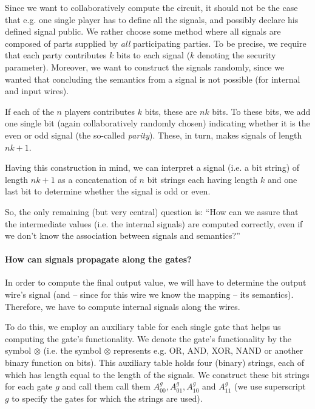 Since we want to collaboratively compute the circuit, it should not be the case that e.g. one single player has to define all the signals, and possibly declare his defined signal public. We rather choose some method where all signals are composed of parts supplied by \emph{all} participating parties. To be precise, we require that each party contributes $k$ bits to each signal ($k$ denoting the security parameter). Moreover, we want to construct the signals randomly, since we wanted that concluding the semantics from a signal is not possible (for internal and input wires).

If each of the $n$ players contributes $k$ bits, these are $nk$ bits. To these bits, we add one single bit (again collaboratively randomly chosen) indicating whether it is the even or odd signal (the so-called \emph{parity}). These, in turn, makes signals of length $nk+1$.

Having this construction in mind, we can interpret a signal (i.e. a bit string) of length $nk+1$ as a concatenation of $n$ bit strings each having length $k$ and one last bit to determine whether the signal is odd or even.

So, the only remaining (but very central) question is: ``How can we assure that the intermediate values (i.e. the internal signals) are computed correctly, even if we don't know the association between signals and semantics?''

\paragraph{How can signals propagate along the gates?}
\label{sec:how-can-signals-propagate}

In order to compute the final output value, we will have to determine the output wire's signal (and -- since for this wire we know the mapping -- its semantics). Therefore, we have to compute internal signals along the wires.

To do this, we employ an auxiliary table for each single gate that helps us computing the gate's functionality. We denote the gate's functionality by the symbol $\otimes$ (i.e. the symbol $\otimes$ represents e.g. OR, AND, XOR, NAND or another binary function on bits). This auxiliary table holds four (binary) strings, each of which has length equal to the length of the signals. We construct these bit strings for each gate $g$ and call them call them $A_{00}^g,A_{01}^g,A_{10}^g$ and $A_{11}^g$ (we use superscript $g$ to specify the gates for which the strings are used). 

